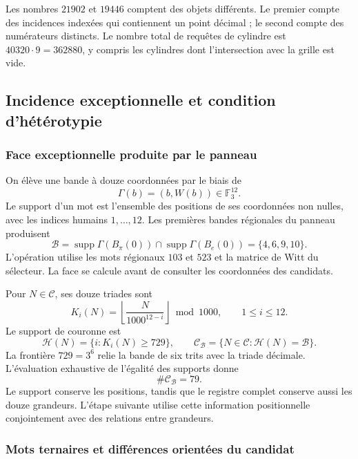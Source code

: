 Les nombres $21902$ et $19446$ comptent des objets différents. Le premier
compte des incidences indexées qui contiennent un point décimal ; le second
compte des numérateurs distincts. Le nombre total de requêtes de cylindre
est $40320\cdot9=362880$, y compris les cylindres dont l'intersection avec
la grille est vide.

\subsection{Incidence exceptionnelle et condition d'hétérotypie}

\subsubsection{Face exceptionnelle produite par le panneau}

On élève une bande à douze coordonnées par le biais de
\[
 \Gamma(b)=(b,W(b))\in\mathbb F_3^{12}.
\]
Le support d'un mot est l'ensemble des positions de ses coordonnées non nulles, avec les indices humains $1,\ldots,12$. Les premières bandes régionales du panneau produisent
\begin{equation}
 \mathcal B=\operatorname{supp}\Gamma(B_\pi(0))
          \cap\operatorname{supp}\Gamma(B_e(0))
          =\{4,6,9,10\}.
 \label{eq:kdes-cara}
\end{equation}
L'opération utilise les mots régionaux $103$ et $523$ et la matrice de Witt du sélecteur. La face se calcule avant de consulter les coordonnées des candidats.

Pour $N\in\mathcal C$, ses douze triades sont
\begin{equation}
 K_i(N)=\left\lfloor\frac{N}{1000^{12-i}}\right\rfloor\bmod1000,
 \qquad1\leq i\leq12.
 \label{eq:kdes-triadas}
\end{equation}
Le support de couronne est
\[
 \mathcal H(N)=\{i:K_i(N)\geq729\},
 \qquad
 \mathcal C_{\mathcal B}=\{N\in\mathcal C:\mathcal H(N)=\mathcal B\}.
\]
La frontière $729=3^6$ relie la bande de six trits avec la triade décimale. L'évaluation exhaustive de l'égalité des supports donne
\begin{equation}
 \#\mathcal C_{\mathcal B}=79.
 \label{eq:kdes-79}
\end{equation}
Le support conserve les positions, tandis que le registre complet
conserve aussi les douze grandeurs. L'étape suivante utilise cette
information positionnelle conjointement avec des relations entre grandeurs.

\subsubsection{Mots ternaires et différences orientées du candidat}

